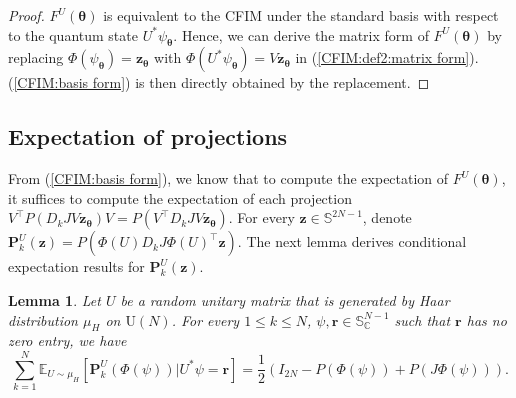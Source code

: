 \documentclass{amsart}
\theoremstyle{plain}
\newtheorem{lemma}{Lemma}
\theoremstyle{definition}
\theoremstyle{remark}
\newcommand{\CC}{\mathbb{C}}
\newcommand{\EE}{\mathbb{E}}
\begin{document}
\begin{proof}
    $F^U(\bm\theta)$ is equivalent to the CFIM under the standard basis with respect to the quantum state $U^*\psi_{\bm\theta}$. Hence, we can derive the matrix form of $F^U(\bm\theta)$ by replacing $\Phi(\psi_{\bm\theta})=\bm{z}_{\bm\theta}$ with $\Phi(U^*\psi_{\bm\theta})=V\bm{z}_{\bm\theta}$ in (\ref{CFIM:def2:matrix form}). (\ref{CFIM:basis form}) is then directly obtained by the replacement.
\end{proof}

\subsection{Expectation of projections}

From (\ref{CFIM:basis form}), we know that to compute the expectation of $F^U(\bm\theta)$, it suffices to compute the expectation of each projection $V^\top P(D_kJV\bm{z}_{\bm\theta})V=P(V^\top D_kJV\bm{z}_{\bm\theta})$. For every $\bm z\in\mathbb S^{2N-1}$, denote $\bm P_k^U(\bm z)=P(\Phi(U)D_kJ\Phi(U)^\top\bm z)$. The next lemma derives conditional expectation results for $\bm P_k^U(\bm z)$.
\begin{lemma}
     \label{thm: conditional expectation of Pk}
     Let $U$ be a random unitary matrix that is generated by Haar distribution $\mu_H$ on $\mathrm U(N)$. For every $1\leq k\leq N$, $\psi,\bm r\in \mathbb S_\CC^{N-1}$ such that $\bm r$ has no zero entry, we have 
    \begin{equation}
        \label{eq:EPk}
        \sum\limits_{k=1}^N\EE_{U\sim\mu_H}[\bm P_k^U(\Phi(\psi))|U^*\psi=\bm r]=\frac{1}{2}\left(I_{2N} - P(\Phi(\psi)) + P(J\Phi(\psi))\right).
    \end{equation}
\end{lemma}
\end{document}
